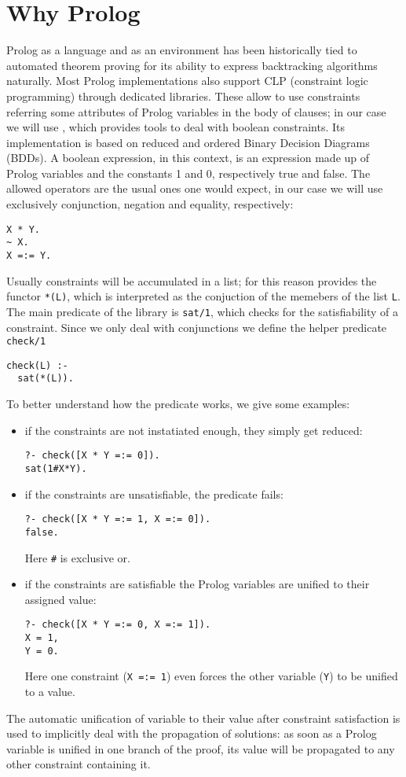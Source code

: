\section{Why Prolog}%
Prolog as a language and as an environment has been historically tied to automated theorem proving for its ability to express backtracking algorithms naturally.
Most Prolog implementations also support CLP (constraint logic programming) through dedicated libraries.
These allow to use constraints referring some attributes of Prolog variables in the body of clauses; in our case we will use \CLPB{} \cite{clpb}, which provides tools to deal with boolean constraints.
Its implementation is based on reduced and ordered Binary Decision Diagrams (BDDs).
A boolean expression, in this context, is an expression made up of Prolog variables and the constants 1 and 0, respectively true and false.
The allowed operators are the usual ones one would expect, in our case we will use exclusively conjunction, negation and equality, respectively:
\begin{verbatim}
X * Y.
~ X.
X =:= Y.
\end{verbatim}
Usually constraints will be accumulated in a list; for this reason \CLPB{} provides the functor \texttt{*(L)}, which is interpreted as the conjuction of the memebers of the list \texttt{L}.
The main predicate of the library is \texttt{sat/1}, which checks for the satisfiability of a constraint.
Since we only deal with conjunctions we define the helper predicate \texttt{check/1}
\begin{verbatim}
check(L) :-
  sat(*(L)).
\end{verbatim}
To better understand how the predicate works, we give some examples:
\begin{itemize}
	\item if the constraints are not instatiated enough, they simply get reduced:
\begin{verbatim}
?- check([X * Y =:= 0]).
sat(1#X*Y).
\end{verbatim}
	\item if the constraints are unsatisfiable, the predicate fails:
\begin{verbatim}
?- check([X * Y =:= 1, X =:= 0]).
false.
\end{verbatim}
	Here \texttt{\#} is exclusive or.
	\item if the constraints are satisfiable the Prolog variables are unified to their assigned value:
\begin{verbatim}
?- check([X * Y =:= 0, X =:= 1]).
X = 1,
Y = 0.
\end{verbatim}
	Here one constraint (\texttt{X =:= 1}) even forces the other variable (\texttt{Y}) to be unified to a value.
\end{itemize}
The automatic unification of variable to their value after constraint satisfaction is used to implicitly deal with the propagation of solutions: as soon as a Prolog variable is unified in one branch of the proof, its value will be propagated to any other constraint containing it.

